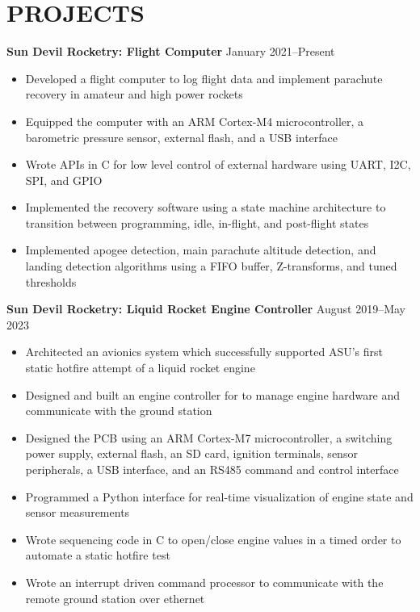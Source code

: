 \documentclass{article}
\begin{document}
\section{PROJECTS}
\textbf{Sun Devil Rocketry: Flight Computer}
\hfill
\vspace{0.5em}
January 2021--Present
\begin{itemize}
\item{Developed a flight computer to log flight data and implement parachute recovery in amateur and high power rockets}
\item{Equipped the computer with an ARM Cortex-M4 microcontroller, a barometric pressure sensor, external flash, and a USB interface}
\item{Wrote APIs in C for low level control of external hardware using UART, I2C, SPI, and GPIO}
\item{Implemented the recovery software using a state machine architecture to transition between programming, idle, in-flight, and post-flight states}
\item{Implemented apogee detection, main parachute altitude detection, and landing detection algorithms using a FIFO buffer, Z-transforms, and tuned thresholds}
\end{itemize}
\vspace{1em}
\textbf{Sun Devil Rocketry: Liquid Rocket Engine Controller}
\hfill
\vspace{0.5em}
August 2019--May 2023
\begin{itemize}
\item{Architected an avionics system which successfully supported ASU's first static hotfire attempt of a liquid rocket engine}
\item{Designed and built an engine controller for to manage engine hardware and communicate with the ground station}
\item{Designed the PCB using an ARM Cortex-M7 microcontroller, a switching power supply, external flash, an SD card, ignition terminals, sensor peripherals, a USB interface, and an RS485 command and control interface}
\item{Programmed a Python interface for real-time visualization of engine state and sensor measurements}
\item{Wrote sequencing code in C to open/close engine values in a timed order to automate a static hotfire test }
\item{Wrote an interrupt driven command processor to communicate with the remote ground station over ethernet}
\end{itemize}
\vspace{0.5em}
\thispagestyle{empty}
\end{document}
